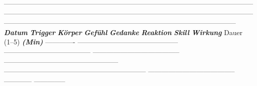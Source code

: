 {-----------------------------------------------------------------------------------------------------------------------------------------------------------------------------------------------------------------------------------------------------------------------------------------------------------------------------
\textbf{\textit{Datum}}   \textbf{\textit{\textcolor{ctmmRed}{Trigger}}}                                \textbf{\textit{Körper}}                           \textbf{\textit{Gefühl}}                           \textbf{\textit{Gedanke}}                                      \textbf{\textit{Reaktion}}                                                 \textbf{\textit{Skill}}                            \textbf{\textit{Wirkung   }}Dauer
(1--5)\textbf{\textit{    (Min)}}
------------- -------------------------------------------- -------------------------------------- -------------------------------------- -------------------------------------------------- -------------------------------------------------------------- -------------------------------------- ------------ --------------
}
